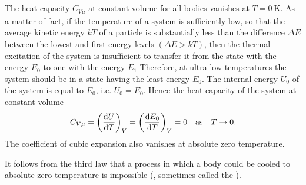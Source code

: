 \subsection{}\label{11.8.4} The heat capacity $C_{V \mu}$ at constant volume  for all bodies vanishes at $T = \SI{0}{\kelvin}$. As a matter of fact, if the temperature of a system is sufficiently low, so that the average kinetic energy $kT$ of a particle  is substantially less than the difference $\Delta E$ between the lowest and first energy lev­els $(\Delta E > kT)$, then the thermal excitation of the system is insufficient to transfer it from the state with the energy $E_{0}$ to one with the energy $E_{1}$ Therefore, at ultra-low temperatures the system should be in a state having the least energy $E_{0}$. The internal energy $U_{0}$ of the system  is equal to $E_{0}$, i.e. $U_{0}= E_{0}$. Hence the heat capacity of the system at constant volume 
\begin{equation*}%
C_{V \mu} = \left( \dv{U}{T}\right)_{V} = \left( \dv{E_{0}}{T}\right)_{V} = 0 \qas T \to 0.
\end{equation*}
The coefficient of cubic expansion  also vanishes at absolute zero temperature.

It follows from the third law that a process in which a body could be cooled to absolute zero temperature is impossible (, sometimes called the ).
